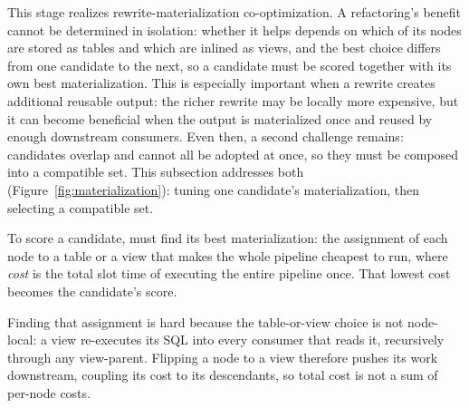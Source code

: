 This stage realizes rewrite-materialization co-optimization. 
A refactoring's benefit cannot be determined in isolation: whether it helps depends on which of its nodes are stored as tables and which are inlined as views, and the best choice differs from one candidate to the next, so a candidate must be scored together with its own best materialization. This is especially important when a rewrite creates additional reusable output: the richer rewrite may be locally more expensive, but it can become beneficial when the output is materialized once and reused by enough downstream consumers. Even then, a second challenge remains: candidates overlap and cannot all be adopted at once, so they must be composed into a compatible set. This subsection addresses both (Figure~\ref{fig:materialization}): tuning one candidate's materialization, then selecting a compatible set.





To score a candidate, \tool{} must find its best materialization: the assignment of each node to a table or a view that makes the whole pipeline cheapest to run, where \emph{cost} is 
the total slot time of executing the entire pipeline once.
 That lowest cost becomes the candidate's score.

 Finding that assignment is hard because the table-or-view choice is not node-local: a view re-executes its SQL into every consumer that reads it, recursively through any view-parent. Flipping a node to a view therefore pushes its work downstream, coupling its cost to its descendants, so total cost is not a sum of per-node costs.
 


 
